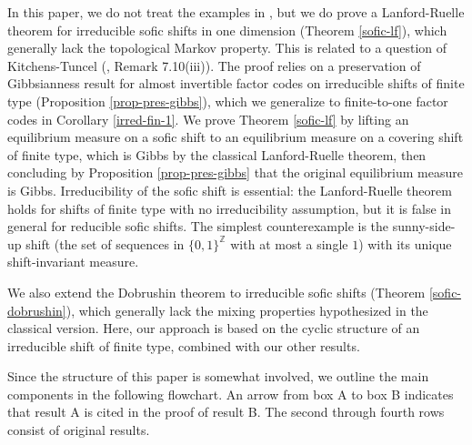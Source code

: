 \documentclass{amsproc}
\numberwithin{theorem}{section}
\theoremstyle{remark}
\theoremstyle{definition}
\newcommand{\Z}{\mathbb{Z}}
\theoremstyle{plain}
\begin{document}
In this paper, we do not treat the examples in \cite{meyerovitch2013gibbs}, but we do prove a Lanford-Ruelle theorem for irreducible sofic shifts in one dimension (Theorem \ref{sofic-lf}), which generally lack the topological Markov property. This is related to a question of Kitchens-Tuncel (\cite{kitchens-tuncel-1985-sofic}, Remark 7.10(iii)). The proof relies on a preservation of Gibbsianness result for almost invertible factor codes on irreducible shifts of finite type (Proposition \ref{prop-pres-gibbs}), which we generalize to finite-to-one factor codes in Corollary \ref{irred-fin-1}. We prove Theorem \ref{sofic-lf} by lifting an equilibrium measure on a sofic shift to an equilibrium measure on a covering shift of finite type, which is Gibbs by the classical Lanford-Ruelle theorem, then concluding by Proposition \ref{prop-pres-gibbs} that the original equilibrium measure is Gibbs. Irreducibility of the sofic shift is essential: the Lanford-Ruelle theorem holds for shifts of finite type with no irreducibility assumption, but it is false in general for reducible sofic shifts. The simplest counterexample is the sunny-side-up shift (the set of sequences in $\{ 0,1 \}^{\Z}$ with at most a single $1$) with its unique shift-invariant measure.



We also extend the Dobrushin theorem to irreducible sofic shifts (Theorem \ref{sofic-dobrushin}), which generally lack the mixing properties hypothesized in the classical version. Here, our approach is based on the cyclic structure of an irreducible shift of finite type, combined with our other results.

Since the structure of this paper is somewhat involved, we outline the main components in the following flowchart. An arrow from box A to box B indicates that result A is cited in the proof of result B. The second through fourth rows consist of original results.

\vspace{1em}
\end{document}
